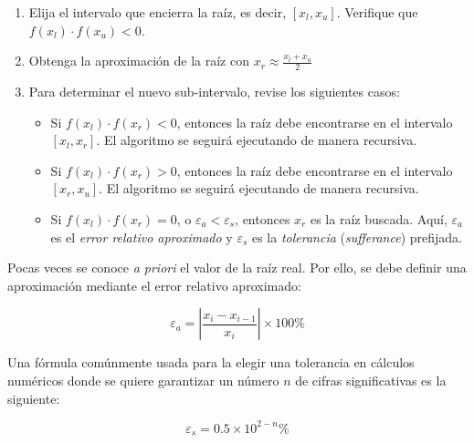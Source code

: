 \begin{enumerate}
	
	\item Elija el intervalo que encierra la raíz, es decir, $[x_l, x_u]$.
		Verifique que $f(x_l) \cdot f(x_u) < 0$.

	\item Obtenga la aproximación de la raíz con $x_r \approx \frac{x_l +
		x_u}{2}$

	\item Para determinar el nuevo sub-intervalo, revise los siguientes casos:
		\begin{itemize}
            \item Si $f(x_l) \cdot f(x_r) < 0$, entonces la raíz debe
                encontrarse en el intervalo $[x_l, x_r]$. El algoritmo se
                seguirá ejecutando de manera recursiva.

            \item Si $f(x_l) \cdot f(x_r) > 0$, entonces la raíz debe
                encontrarse en el intervalo $[x_r, x_u]$. El algoritmo se
                seguirá ejecutando de manera recursiva.

            \item Si $f(x_l) \cdot f(x_r) = 0$, o \(\varepsilon_a <
                \varepsilon_s\), entonces $x_r$ es la raíz buscada. Aquí,
                $\varepsilon_a$ es el \emph{error relativo aproximado} y
                $\varepsilon_s$ es la \emph{tolerancia} (\textit{sufferance})
                prefijada.

        \end{itemize}
\end{enumerate}

Pocas veces se conoce \textit{a priori} el valor de la raíz real. Por ello, se
debe definir una aproximación mediante el error relativo aproximado:

\[
	\varepsilon_a = \left| \frac{x_i - x_{i-1}}{x_i} \right| \times 100\%
\]

Una fórmula comúnmente usada para la elegir una tolerancia en cálculos numéricos
donde se quiere garantizar un número $n$ de cifras significativas es la
siguiente:

\[
	\varepsilon_s = 0.5 \times 10^{2-n} \%
\]

